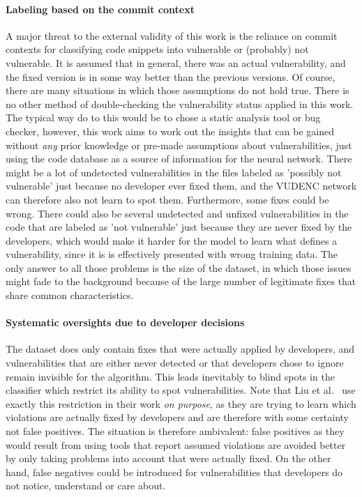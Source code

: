 \documentclass[
a4paper,
pagesize,
pdftex,
12pt,
twoside, %
BCOR=5mm, %
ngerman,
fleqn,
final,
]{scrartcl}
\begin{document}
	\paragraph{Labeling based on the commit context}
	A major threat to the external validity of this work is the reliance on commit contexts for classifying code snippets into vulnerable or (probably) not vulnerable. It is assumed that in general, there was an actual vulnerability, and the fixed version is in some way better than the previous versions. Of course, there are many situations in which those assumptions do not hold true. There is no other method of double-checking the vulnerability status applied in this work. The typical way do to this would be to chose a static analysis tool or bug checker, however, this work aims to work out the insights that can be gained without \textit{any} prior knowledge or pre-made assumptions about vulnerabilities, just using the code database as a source of information for the neural network. There might be a lot of undetected vulnerabilities in the files labeled as 'possibly not vulnerable' just because no developer ever fixed them, and the VUDENC network can therefore also not learn to spot them. Furthermore, some fixes could be wrong. There could also be several undetected and unfixed vulnerabilities in the code that are labeled as 'not vulnerable' just because they are never fixed by the developers, which would make it harder for the model to learn what defines a vulnerability, since it is is effectively presented with wrong training data. The only answer to all those problems is the size of the dataset, in which those issues might fade to the background because of the large number of legitimate fixes that share common characteristics.\\
	\paragraph{Systematic oversights due to developer decisions}
	The dataset does only contain fixes that were actually applied by developers, and vulnerabilities that are either never detected or that developers chose to ignore remain invisible for the algorithm. This leads inevitably to blind spots in the classifier which restrict its ability to spot vulnerabilities. Note that Liu et al.~\cite{Liu.2018} use exactly this restriction in their work \textit{on purpose}, as they are trying to learn which violations are actually fixed by developers and are therefore with some certainty  not false positives. The situation is therefore ambivalent: false positives as they would result from using tools that report assumed violations are avoided better by only taking problems into account that were actually fixed. On the other hand, false negatives could be introduced for vulnerabilities that developers do not notice, understand or care about.
\end{document}
